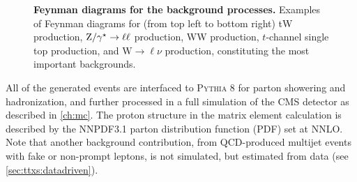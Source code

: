 \begin{figure}[t]
    \vspace{0.3cm}
    \hspace{1.0cm}
    \caption{\textbf{Feynman diagrams for the background processes.} Examples of Feynman diagrams for (from top left to bottom right) tW production, $\mathrm{Z}/\gamma^\star \rightarrow \ell\ell$ production, WW production, $t$-channel single top production, and $\mathrm{W} \rightarrow \ell\nu$ production, constituting the most important backgrounds.}
    \label{fig:ttxs:feynman}
\end{figure}

All of the generated events are interfaced to \textsc{Pythia 8} for parton showering and hadronization, and further processed in a full simulation of the CMS detector as described in \cref{ch:mc}. The proton structure in the matrix element calculation is described by the NNPDF3.1 parton distribution function (PDF) set at NNLO. Note that another background contribution, from QCD-produced multijet events with fake or non-prompt leptons, is not simulated, but estimated from data (see \cref{sec:ttxs:datadriven}).

